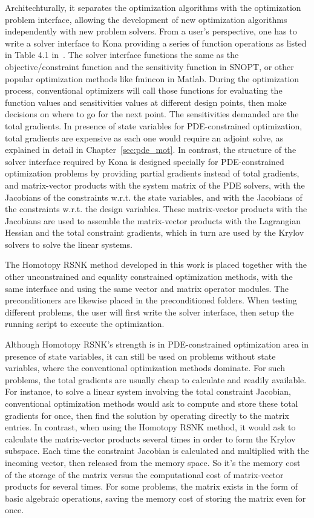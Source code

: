 Architechturally, it separates the optimization algorithms with the optimization 
problem interface, allowing the development of new optimization algorithms independently with 
new problem solvers. From a user's perspective, one has to write a solver interface to Kona providing 
a series of function operations as listed in Table 4.1 in~\cite{dener_thesis_2017}. The solver interface 
functions the same as the objective/constraint function and the sensitivity function in SNOPT, or 
other popular optimization methods like fmincon in Matlab. During the optimization process, 
conventional optimizers will call those functions for evaluating the function values and sensitivities 
values at different design points, then make decisions on where to go for the next point. 
The sensitivities demanded are the total gradients. In presence of state variables for 
PDE-constrained optimization, total gradients are expensive as each one would require an adjoint solve, 
as explained in detail in Chapter~\ref{sec:pde_mot}. In contrast, the structure of the solver interface 
required by Kona is designed specially for PDE-constrained optimization problems by providing 
partial gradients instead of total gradients, and matrix-vector products with the system matrix of 
the PDE solvers, with the Jacobians of the constraints w.r.t. the state variables, and with 
the Jacobians of the constraints w.r.t. the design variables. These matrix-vector products 
with the Jacobians are used to assemble the matrix-vector products with the Lagrangian Hessian 
and the total constraint gradients, which in turn are used by the Krylov solvers to solve the linear systems.    

The Homotopy RSNK method developed in this work is placed together with the other unconstrained 
and equality constrained optimization methods, with the same interface and using the same 
vector and matrix operator modules. The preconditioners are likewise placed in the preconditioned folders. 
When testing different problems, the user will first write the solver interface, then setup the running script 
to execute the optimization. 

Although Homotopy RSNK's strength is in PDE-constrained optimization area in presence of 
state variables, it can still be used on problems without state variables, where the conventional 
optimization methods dominate.  For such problems, the total gradients are usually cheap to 
calculate and readily available. For instance, to solve a linear system involving the total constraint Jacobian, 
conventional optimization methods would ask to compute and 
store these total gradients for once, then find the solution by operating directly to the matrix entries.  
In contrast, when using the Homotopy RSNK method, it would ask to calculate the matrix-vector 
products several times in order to form the Krylov subspace. Each time the constraint Jacobian is 
calculated and multiplied with the incoming vector, then released from the memory space. 
So it's the memory cost of the storage of the matrix versus the computational cost of matrix-vector products 
for several times. For some problems, the matrix exists in the form of basic algebraic operations, saving the memory cost of storing the matrix even for once. 


